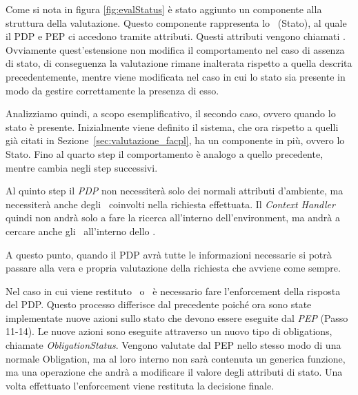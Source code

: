 Come si nota in figura \ref{fig:evalStatus} è stato aggiunto un componente alla struttura della valutazione.
Questo componente rappresenta lo \status \ (Stato), al quale il \ac{PDP} e \ac{PEP} ci accedono tramite attributi.
Questi attributi vengono chiamati \statusattribute. Ovviamente quest'estensione non modifica il comportamento nel caso di assenza di stato, di conseguenza la valutazione rimane inalterata rispetto a quella descrita precedentemente, mentre viene modificata nel caso in cui lo stato sia presente in modo da gestire correttamente la presenza di esso.\\ \par
Analizziamo quindi, a scopo esemplificativo, il secondo caso, ovvero quando lo stato è presente. Inizialmente viene definito il sistema, che ora rispetto a quelli già citati in Sezione~\ref{sec:valutazione_facpl}, ha un componente in più, ovvero lo Stato.
Fino al quarto step il comportamento è analogo a quello precedente, mentre cambia negli step successivi.\\ \par
Al quinto step il \textit{PDP} non necessiterà solo dei normali attributi d'ambiente, ma necessiterà anche degli \statusattribute \ coinvolti nella richiesta effettuata. Il \textit{Context Handler} quindi non andrà solo a fare la ricerca all'interno dell'environment, ma andrà a cercare anche gli \statusattribute \ all'interno dello \status.\\ \par
A questo punto, quando il PDP avrà tutte le informazioni necessarie si potrà passare alla vera e propria valutazione della richiesta che avviene come sempre.\\ \par
Nel caso in cui viene restituto \permit \ o \deny \ è necessario fare l'enforcement della risposta del PDP. Questo processo differisce dal precedente poiché ora sono state implementate nuove azioni sullo stato che devono essere eseguite dal \textit{PEP} (Passo 11-14). Le nuove azioni sono eseguite attraverso un nuovo tipo di obligations, chiamate \textit{ObligationStatus}. Vengono valutate dal \ac{PEP} nello stesso modo di una normale Obligation, ma al loro interno non sarà contenuta un generica funzione, ma una operazione che andrà a modificare il valore degli attributi di stato.
Una volta effettuato l'enforcement viene restituta la decisione finale.




